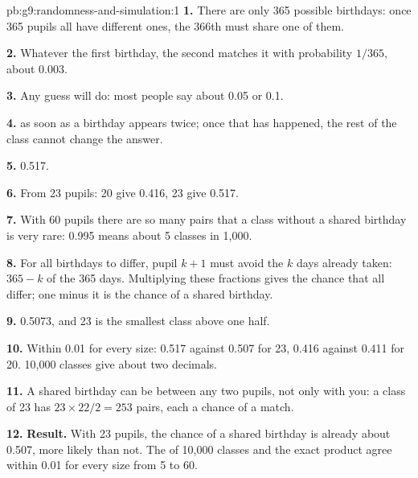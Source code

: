 \begin{solution}{pb:g9:randomness-and-simulation:1}
\textbf{1.} There are only 365 possible birthdays: once 365 pupils all have
different ones, the 366th must share one of them.

\textbf{2.} Whatever the first birthday, the second matches it with probability
$1/365$, about 0.003.

\textbf{3.} Any guess will do: most people say about 0.05 or 0.1.

\textbf{4.}  as soon as a birthday appears twice; once that has
happened, the rest of the class cannot change the answer.

\label{out:g9:randomness-and-simulation:birthday}

\textbf{5.} 0.517.

\textbf{6.} From 23 pupils: 20 give 0.416, 23 give 0.517.

\textbf{7.} With 60 pupils there are so many pairs that a class without a
shared birthday is very rare: 0.995 means about 5 classes in 1,000.

\textbf{8.} For all birthdays to differ, pupil $k + 1$ must avoid the $k$ days
already taken: $365 - k$ of the 365 days. Multiplying these fractions gives the
chance that all differ; one minus it is the chance of a shared birthday.

\label{out:g9:randomness-and-simulation:exact}

\textbf{9.} 0.5073, and 23 is the smallest class above one half.

\textbf{10.} Within 0.01 for every size: 0.517 against 0.507 for 23, 0.416
against 0.411 for 20. 10,000 classes give about two decimals.

\textbf{11.} A shared birthday can be between any two pupils, not only with
you: a class of 23 has $23 \times 22 / 2 = 253$ pairs, each a chance of a
match.

\textbf{12.} \textbf{Result.} With 23 pupils, the chance of a shared birthday
is already about 0.507, more likely than not. The  of 10,000 classes
and the exact product agree within 0.01 for every size from 5 to 60.
\end{solution}
